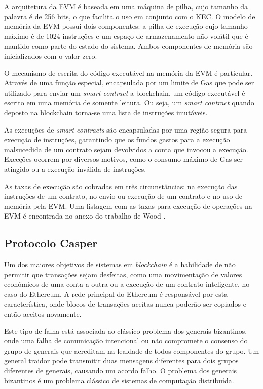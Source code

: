 \documentclass[tcc,capa]{texufpel}
\begin{document}
	A arquitetura da EVM é baseada em uma máquina de pilha, cujo tamanho da palavra é de 256 bits, o que facilita o uso em conjunto com o KEC. O modelo de memória da EVM possui dois componentes: a pilha de execução cujo tamanho máximo é de 1024 instruções e um espaço de armazenamento não volátil que é mantido como parte do estado do sistema. Ambos componentes de memória são inicializados com o valor zero.
	
	O mecanismo de escrita do código executável na memória da EVM é particular. Através de uma função especial, encapsulada por um limite de Gas que pode ser utilizado para enviar um \textit{smart contract} a blockchain, um código executável é escrito em uma memória de somente leitura. Ou seja, um \textit{smart contract} quando deposto na blockchain torna-se uma lista de instruções imutáveis.
	
	As execuções de \textit{smart contracts} são encapsuladas por uma região segura para execução de instruções, garantindo que os fundos gastos para a execução malsucedida de um contrato sejam devolvidos a conta que invocou a execução. Exceções ocorrem por diversos motivos, como o consumo máximo de Gas ser atingido ou a execução inválida de instruções.
	
	As taxas de execução são cobradas em três circunstâncias: na execução das instruções de um contrato, no envio ou execução de um contrato e no uso de memória pela EVM. Uma listagem com as taxas para execução de operações na EVM é encontrada no anexo do trabalho de Wood \cite{wood2014ethereum}.
  
    
    \subsection{Protocolo Casper}
    
    Um dos maiores objetivos de sistemas em \textit{blockchain} é a habilidade de não permitir que transações sejam desfeitas, como uma movimentação de valores econômicos de uma conta a outra ou a execução de um contrato inteligente, no caso do Ethereum. A rede principal do Ethereum é responsável por esta característica, onde blocos de transações aceitas nunca poderão ser copiados e então aceitos novamente.
    
    Este tipo de falha está associada ao clássico problema dos generais bizantinos, onde uma falha de comunicação intencional ou não compromete o consenso do grupo de generais que acreditam na lealdade de todos componentes do grupo. Um general traidor pode transmitir duas mensagens diferentes para dois grupos diferentes de generais, causando um acordo falho. O problema dos generais bizantinos é um problema clássico de sistemas de computação distribuída.
    
\end{document}
